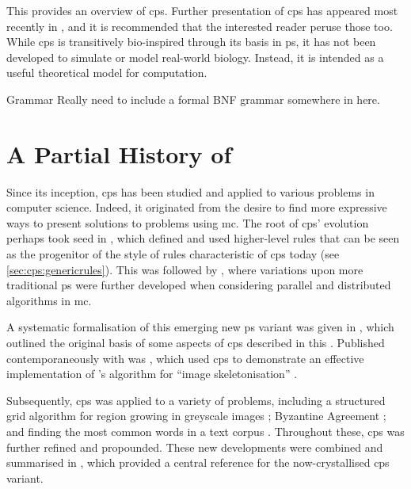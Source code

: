 This  provides an overview of \gls{cps}.  Further presentation of \gls{cps} has appeared most recently in \cite{Nicolescu2018,Henderson2019,Henderson2020,Liu2020,Liu2021}, and it is recommended that the interested reader peruse those too.  While \gls{cps} is transitively bio-inspired through its basis in \gls{ps}, it has not been developed to simulate or model real-world biology.  Instead, it is intended as a useful theoretical model for computation.

\begin{anfxwarning}{Grammar}
Really need to include a formal BNF grammar somewhere in here.
\end{anfxwarning}

\section{A Partial History of }

Since its inception, \gls{cps} has been studied and applied to various problems in computer science.  Indeed, it originated from the desire to find more expressive ways to present solutions to problems using \gls{mc}.  The root of \gls{cps}' evolution perhaps took seed in \cite{Balanescu2011}, which defined and used higher-level rules that can be seen as the progenitor of the style of rules characteristic of \gls{cps} today (see \vref{sec:cps:genericrules}).  This was followed by \cite{Nicolescu2012}, where variations upon more traditional \gls{ps} were further developed when considering parallel and distributed algorithms in \gls{mc}.

A systematic formalisation of this emerging new \gls{ps} variant was given in \cite{Nicolescu2014a}, which outlined the original basis of some aspects of \gls{cps} described in this .  Published contemporaneously with \cite{Nicolescu2014a} was \cite{Nicolescu2014}, which used \gls{cps} to demonstrate an effective implementation of \citeauthor{Guo1989}'s algorithm for ``image skeletonisation'' \cite{Guo1989}.

Subsequently, \gls{cps} was applied to a variety of problems, including a structured grid algorithm for region growing in greyscale images \cite{Nicolescu2015}; Byzantine Agreement \cite{Nicolescu2017}; and finding the most common words in a text corpus \cite{Nicolescu2018a}.  Throughout these, \gls{cps} was further refined and propounded.  These new developments were combined and summarised in \cite{Nicolescu2018}, which provided a central reference for the now-crystallised \gls{cps} variant.

